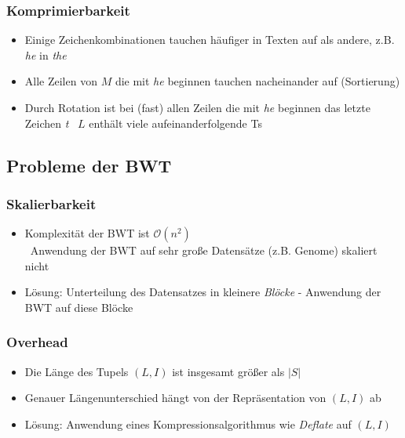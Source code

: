 \documentclass[14pt,xcolor=dvipsnames,pdftex]{beamer}
\begin{document}
\begin{frame}
 \frametitle{Komprimierbarkeit}
 \begin{itemize}
  \item Einige Zeichenkombinationen tauchen häufiger in Texten auf als andere, z.B. \textit{he} in \textit{the}
  \item Alle Zeilen von $M$ die mit \textit{he} beginnen tauchen nacheinander auf (Sortierung)
  \item Durch Rotation ist bei (fast) allen Zeilen die mit \textit{he} beginnen das letzte Zeichen \textit{t}
  \textrightarrow\ $L$ enthält viele aufeinanderfolgende Ts
 \end{itemize}
\end{frame}

\subsection{Probleme der BWT}
\begin{frame}
 \frametitle{Skalierbarkeit}
 \begin{itemize}
  \item Komplexität der BWT ist $\mathcal{O}(n^2)$\\
    \textrightarrow \ Anwendung der BWT auf sehr große Datensätze (z.B. Genome) skaliert nicht
    \pause
  \item Lösung: Unterteilung des Datensatzes in kleinere \textit{Blöcke} - Anwendung der BWT auf diese Blöcke
 \end{itemize}
\end{frame}
\begin{frame}
 \frametitle{Overhead}
 \begin{itemize}
  \item Die Länge des Tupels $(L,I)$ ist insgesamt größer als $|S|$
  \item Genauer Längenunterschied hängt von der Repräsentation von $(L,I)$ ab
  \item Lösung: Anwendung eines Kompressionsalgorithmus wie \textit{Deflate} auf $(L,I)$
  \end{itemize}
\end{frame}
\end{document}
